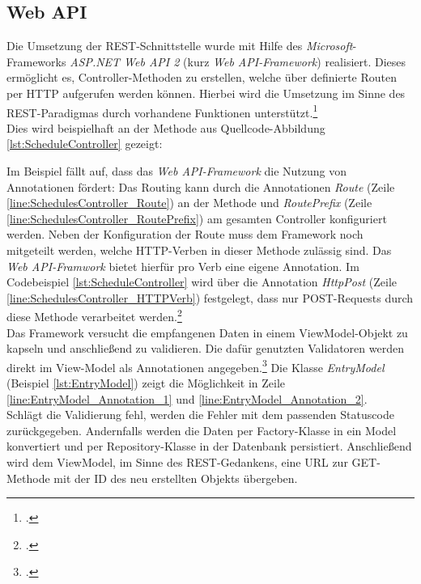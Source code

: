 \subsection{Web API}
\label{ssec:aufbau-webapi}
Die Umsetzung der \ac{REST}-Schnittstelle wurde mit Hilfe des \textit{Microsoft}-Frameworks \textit{ASP.NET Web API 2} (kurz \textit{Web \ac{API}-Framework}) realisiert. Dieses ermöglicht es, Controller-Methoden zu erstellen, welche über definierte Routen per \ac{HTTP} aufgerufen werden können. Hierbei wird die Umsetzung im Sinne des \ac{REST}-Paradigmas durch vorhandene Funktionen unterstützt.\footcite[S. 2ff.]{Building-a-REST-Service}\\
Dies wird beispielhaft an der Methode aus  Quellcode-Abbildung \ref{lst:ScheduleController} gezeigt:

Im Beispiel fällt auf, dass das \textit{Web \ac{API}-Framework} die Nutzung von Annotationen fördert: Das Routing kann durch die Annotationen \textit{Route} (Zeile \ref{line:SchedulesController_Route}) an der Methode und \textit{RoutePrefix} (Zeile \ref{line:SchedulesController_RoutePrefix}) am gesamten Controller konfiguriert werden. Neben der Konfiguration der Route muss dem Framework noch mitgeteilt werden, welche \ac{HTTP}-Verben in dieser Methode zulässig sind. Das \textit{Web \ac{API}-Framwork} bietet hierfür pro Verb eine eigene Annotation. Im Codebeispiel \ref{lst:ScheduleController} wird über die Annotation \textit{HttpPost} (Zeile \ref{line:SchedulesController_HTTPVerb}) festgelegt, dass nur POST-Requests durch diese Methode verarbeitet werden.\footcite{webApi-AttributeRouting} \\
Das Framework versucht die empfangenen Daten in einem ViewModel-Objekt zu kapseln und anschließend zu validieren. Die dafür genutzten Validatoren werden direkt im View-Model als Annotationen angegeben.\footcite{webApi-Validation} Die Klasse \textit{EntryModel} (Beispiel \ref{lst:EntryModel}) zeigt die Möglichkeit in Zeile \ref{line:EntryModel_Annotation_1} und \ref{line:EntryModel_Annotation_2}. \\ 

Schlägt die Validierung fehl, werden die Fehler mit dem passenden Statuscode zurückgegeben. Andernfalls werden die Daten per \gls{Factory}-Klasse in ein Model konvertiert und per \gls{Repository}-Klasse in der Datenbank persistiert. Anschließend wird dem ViewModel, im Sinne des \ac{REST}-Gedankens, eine URL zur GET-Methode mit der ID des neu erstellten Objekts übergeben. 
